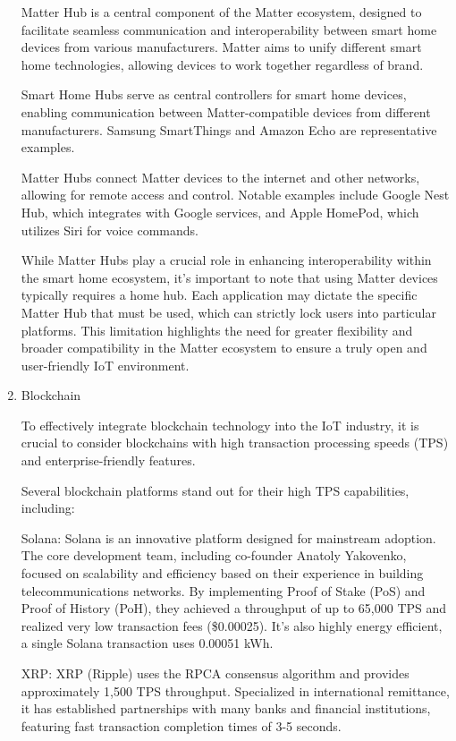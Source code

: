\documentclass[conference]{IEEEtran}
\begin{document}
\begin{enumerate}[itemsep=2ex, parsep=1ex]
			Matter Hub is a central component of the Matter ecosystem, designed to facilitate
			seamless communication and interoperability between smart home devices from
			various manufacturers. Matter aims to unify different smart home
			technologies, allowing devices to work together regardless of brand.

			Smart Home Hubs serve as central controllers for smart home devices,
			enabling communication between Matter-compatible devices from different
			manufacturers. Samsung SmartThings and Amazon Echo are representative examples.

			Matter Hubs connect Matter devices to the internet and other networks,
			allowing for remote access and control. Notable examples include Google Nest
			Hub, which integrates with Google services, and Apple HomePod, which
			utilizes Siri for voice commands.

			While Matter Hubs play a crucial role in enhancing interoperability within
			the smart home ecosystem, it's important to note that using Matter devices
			typically requires a home hub. Each application may dictate the specific
			Matter Hub that must be used, which can strictly lock users into particular
			platforms. This limitation highlights the need for greater flexibility and
			broader compatibility in the Matter ecosystem to ensure a truly open and
			user-friendly IoT environment.

		\item Blockchain

			To effectively integrate blockchain technology into the IoT industry, it is
			crucial to consider blockchains with high transaction processing speeds (TPS)
			and enterprise-friendly features.

			Several blockchain platforms stand out for their high TPS capabilities,
			including:

			Solana: Solana is an innovative platform designed for mainstream adoption.
			The core development team, including co-founder Anatoly Yakovenko, focused
			on scalability and efficiency based on their experience in building
			telecommunications networks. By implementing Proof of Stake (PoS) and Proof
			of History (PoH), they achieved a throughput of up to 65,000 TPS and
			realized very low transaction fees (\$0.00025). It's also highly energy
			efficient, a single Solana transaction uses 0.00051 kWh.

			XRP: XRP (Ripple) uses the RPCA consensus algorithm and provides
			approximately 1,500 TPS throughput. Specialized in international remittance,
			it has established partnerships with many banks and financial institutions,
			featuring fast transaction completion times of 3-5 seconds.


\end{enumerate}
\end{document}
